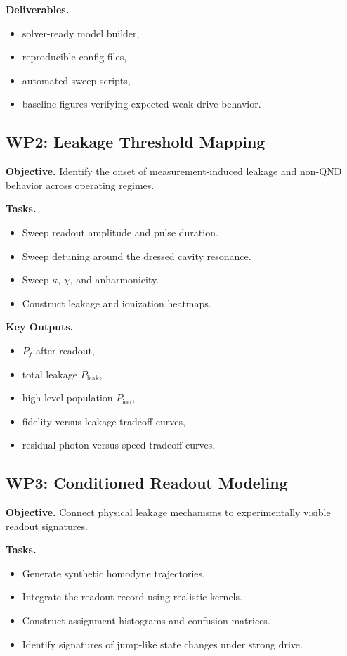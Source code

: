 \documentclass[11pt]{article}
\begin{document}
\textbf{Deliverables.}
\begin{itemize}[leftmargin=2em]
    \item solver-ready model builder,
    \item reproducible config files,
    \item automated sweep scripts,
    \item baseline figures verifying expected weak-drive behavior.
\end{itemize}

\subsection{WP2: Leakage Threshold Mapping}

\textbf{Objective.} Identify the onset of measurement-induced leakage and non-QND behavior
across operating regimes.

\textbf{Tasks.}
\begin{itemize}[leftmargin=2em]
    \item Sweep readout amplitude and pulse duration.
    \item Sweep detuning around the dressed cavity resonance.
    \item Sweep $\kappa$, $\chi$, and anharmonicity.
    \item Construct leakage and ionization heatmaps.
\end{itemize}

\textbf{Key Outputs.}
\begin{itemize}[leftmargin=2em]
    \item $P_f$ after readout,
    \item total leakage $P_{\mathrm{leak}}$,
    \item high-level population $P_{\mathrm{ion}}$,
    \item fidelity versus leakage tradeoff curves,
    \item residual-photon versus speed tradeoff curves.
\end{itemize}

\subsection{WP3: Conditioned Readout Modeling}

\textbf{Objective.} Connect physical leakage mechanisms to experimentally visible readout
signatures.

\textbf{Tasks.}
\begin{itemize}[leftmargin=2em]
    \item Generate synthetic homodyne trajectories.
    \item Integrate the readout record using realistic kernels.
    \item Construct assignment histograms and confusion matrices.
    \item Identify signatures of jump-like state changes under strong drive.
\end{itemize}
\end{document}
